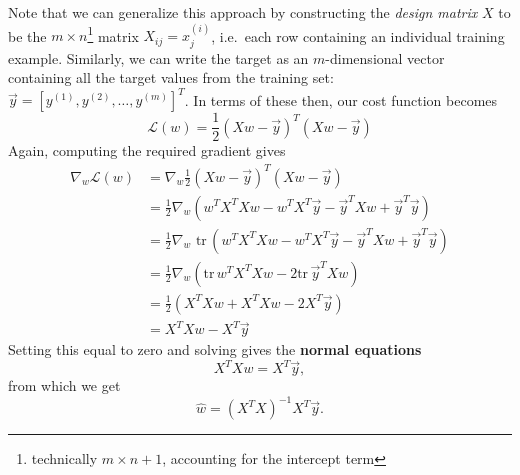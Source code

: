 \documentclass[../main.tex]{subfiles}
\begin{document}
Note that we can generalize this approach by constructing the \emph{design
matrix} $X$ to be the $m\times n$\footnote{technically $m\times n + 1$,
accounting for the intercept term} matrix $X_{ij} = x^{(i)}_j$, i.e.\ each row
containing an individual training example.
%
Similarly, we can write the target as an $m$-dimensional vector containing all
the target values from the training set: $\vec{y} = {[y^{(1)}, y^{(2)}, \ldots,
y^{(m)}]}^{T}$.
%
In terms of these then, our cost function becomes 
%
\begin{equation}
  \mathcal{L}(w) = \frac{1}{2}{\left(X w - \vec{y}\right)}^{T}{\left(X w -
  \vec{y}\right)}
\end{equation}
%
Again, computing the required gradient gives
%
\begin{align}
  \nabla_{w} \mathcal{L}(w) 
  &= \nabla_{w}\frac{1}{2}{\left(X w - \vec{y}\right)}^{T}{\left(X w - \vec{y}\right)} \\
  &= \frac{1}{2}\nabla_{w} {\left(w^{T}X^{T}X w - w^{T} X^{T} \vec{y} - \vec{y}^{T} X w + \vec{y}^{T} \vec{y}\right)} \\
  &= \frac{1}{2}\nabla_{w} \,\,\mathrm{tr}\,{\left(w^{T}X^{T} X w - w^{T} X^{T} \vec{y} - \vec{y}^{T} X w +
    \vec{y}^{T}\vec{y}\right)}\\
  &= \frac{1}{2} \nabla_{w} {\left(\mathrm{tr}\,w^{T}X^{T} X w - 2 \mathrm{tr}\,\vec{y}^{T} X w\right)}\\
  &= \frac{1}{2}{\left(X^{T}X w + X^{T} X w - 2 X^{T} \vec{y}\right)}\\
  &= X^{T} X w - X^{T} \vec{y}
\end{align}
%
Setting this equal to zero and solving gives the \textbf{normal equations}
%
\begin{equation}
  X^{T} X w = X^{T} \vec{y},
  \label{eq:normal_equations}
\end{equation}
%
from which we get
%
\begin{equation}
  \hat{w} = {\left(X^{T} X\right)}^{-1} X^{T} \vec{y}.
    \label{eq:linear_regression_solution}
\end{equation} 
\end{document}
